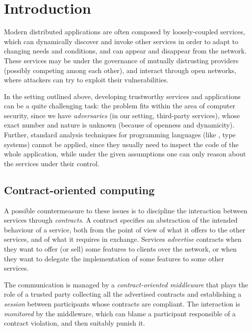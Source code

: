 \section{Introduction}


Modern distributed applications are often composed 
by loosely-coupled services, 
which can dynamically discover and invoke other services
in order to adapt to changing needs and conditions,
and can appear and disappear from the network. %
These services may be under the governance of mutually distrusting providers 
(possibly competing among each other), 
and interact through open networks, %
where attackers can try to exploit their vulnerabilities. %

In the setting outlined above, %
developing trustworthy services and applications 
can be a quite challenging task:
the problem fits within the area of computer security,
since we have \emph{adversaries} (in our setting, third-party services),
whose exact number and nature is unknown 
(because of openness and dynamicity). %
%
Further, standard analysis techniques for programming languages
(like \eg, type systems) cannot be applied, 
since they usually need to inspect the code of the whole application,
while under the given assumptions one can only %
reason about the services under their control. %

\subsection*{Contract-oriented computing}

A possible countermeasure to these issues is to discipline the interaction
between services through \emph{contracts}.
A contract specifies an abstraction of the intended behaviour of a service,
both from the point of view of what it offers to the other services, 
and of what it requires in exchange.
Services \emph{advertise} contracts when they want to offer 
(or sell) some features to clients over the network, or when 
they want to delegate the implementation of some features to some other services.

The communication is managed by a \emph{contract-oriented middleware}
that plays the role of a trusted party collecting
all the advertised contracts and establishing a \textit{session}
between participants whose contracts are compliant. %
The interaction is \textit{monitored} by the middleware, %
which can blame a participant responsible of
a contract violation, and then suitably punish it. 

